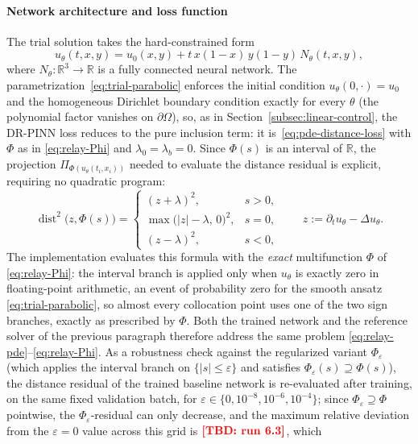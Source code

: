 \documentclass[11pt]{elsarticle}
\newcommand{\TBD}[1]{{\color{red}\textbf{[TBD: #1]}}}
\providecommand{\RelayEpsSens}{\TBD{run 6.3}}
\theoremstyle{definition}
\theoremstyle{remark}
\numberwithin{equation}{section}
\def\dist{\operatorname{dist}}
\begin{document}
\paragraph{Network architecture and loss function}
The trial solution takes the hard-constrained form
\begin{equation}
	\label{eq:trial-parabolic}
	u_\theta(t,x,y)
	= u_0(x,y) + t\,x(1-x)\,y(1-y)\,N_\theta(t,x,y),
\end{equation}
where $N_\theta:\mathbb{R}^3\to\mathbb{R}$ is a fully connected neural
network. The parametrization~\eqref{eq:trial-parabolic} enforces the
initial condition $u_\theta(0,\cdot)=u_0$ and the homogeneous Dirichlet
boundary condition exactly for every $\theta$ (the polynomial factor
vanishes on $\partial\Omega$), so, as in
Section~\ref{subsec:linear-control}, the DR-PINN loss reduces to the pure
inclusion term: it is~\eqref{eq:pde-distance-loss} with
$\Phi$ as in \eqref{eq:relay-Phi} and $\lambda_0=\lambda_b=0$. Since $\Phi(s)$ is an interval of
$\mathbb{R}$, the projection $\Pi_{\Phi(u_\theta(t_i,x_i))}$ needed to
evaluate the distance residual is explicit, requiring no quadratic program:
\[
\dist^2\!\bigl(z,\Phi(s)\bigr)
=
\begin{cases}
(z+\lambda)^2, & s>0,\\[2pt]
\max\bigl(|z|-\lambda,\,0\bigr)^2, & s=0,\\[2pt]
(z-\lambda)^2, & s<0,
\end{cases}
\qquad
z:=\partial_t u_\theta-\Delta u_\theta.
\]
The implementation evaluates this formula with the \emph{exact}
multifunction $\Phi$ of \eqref{eq:relay-Phi}: the interval branch is
applied only when $u_\theta$ is exactly zero in floating-point
arithmetic, an event of probability zero for the smooth ansatz
\eqref{eq:trial-parabolic}, so almost every collocation point uses one of
the two sign branches, exactly as prescribed by $\Phi$. Both the trained
network and the reference solver of the previous paragraph therefore
address the same problem \eqref{eq:relay-pde}--\eqref{eq:relay-Phi}. As a
robustness check against the regularized variant
$\Phi_\varepsilon$ (which applies the interval branch on
$\{|s|\le\varepsilon\}$ and satisfies
$\Phi_\varepsilon(s)\supseteq\Phi(s)$), the distance residual of the
trained baseline network is re-evaluated after training, on the same
fixed validation batch, for
$\varepsilon\in\{0,10^{-8},10^{-6},10^{-4}\}$; since
$\Phi_\varepsilon\supseteq\Phi$ pointwise, the $\Phi_\varepsilon$-residual
can only decrease, and the maximum relative deviation from the
$\varepsilon=0$ value across this grid is $\RelayEpsSens$, which
\end{document}
